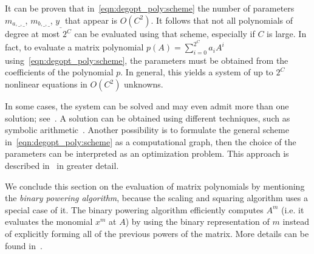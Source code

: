 It can be proven that in~\eqref{eqn:degopt_poly:scheme} the number of parameters $m_{a,\_,\_}$, $m_{b,\_,\_}$, $y_{\_}$ that appear is $O(C^2)$. It follows that not all polynomials of degree at most $2^C$ can be evaluated using that scheme, especially if $C$ is large. In fact, to evaluate a matrix polynomial $p(A)=\sum_{i=0}^{2^C}a_iA^i$ using~\eqref{eqn:degopt_poly:scheme}, the parameters must be obtained from the coefficients of the polynomial $p$. In general, this yields a system of up to $2^C$ nonlinear equations in $O(C^2)$ unknowns. 

In some cases, the system can be solved and may even admit more than one solution; see~\cite[§~2]{sastre:siad25_beyond}. A solution can be obtained using different techniques, such as symbolic arithmetic~\cite{sastre:si21_efficient, sastre:boosting_19:expm}. Another possibility is to formulate the general scheme in~\eqref{eqn:degopt_poly:scheme} as a computational graph, then the choice of the parameters can be interpreted as an optimization problem. This approach is described in~\cite{fasi:jfr23_compgraphs} in greater detail.
\bigskip

\noindent We conclude this section on the evaluation of matrix polynomials by mentioning the \emph{binary powering algorithm}, because the scaling and squaring algorithm uses a special case of it. The binary powering algorithm efficiently computes $A^m$ (i.e. it evaluates the monomial $x^m$ at $A$) by using the binary representation of $m$ instead of explicitly forming all of the previous powers of the matrix. More details can be found in~\cite[§~4.1]{higham:matfun_book}.





